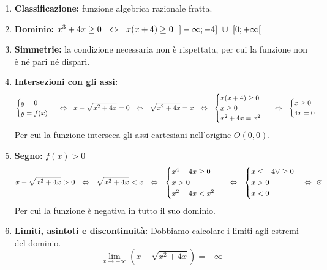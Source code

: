     \begin{ex}
        [Studiare la funzione $y=x-\sqrt{x^2+4x}$, tralasciando la derivata seconda.]
        \begin{enumerate}
            \item \textbf{Classificazione:} funzione algebrica razionale fratta.
            \item \textbf{Dominio:} $x^3+4x\geq 0\ \ \Harr \ \ x(x+4)\geq 0\ \ ]-\infty;-4]\ \cup \ [0;+\infty[$
            \item \textbf{Simmetrie:} la condizione necessaria non è rispettata, per cui la funzione non è né pari né dispari.
            \item \textbf{Intersezioni con gli assi:} 
            \[\begin{cases}
                y=0\\
                y=f(x)
            \end{cases}\ \Harr \ \ x-\sqrt{x^2+4x}=0\ \ \Harr \ \ \sqrt{x^2+4x}=x\ \ \Harr\ \ \begin{cases}
                x(x+4)\geq 0\\
                x\geq 0\\
                x^2+4x=x^2
            \end{cases}\ \ \Harr\ \ \begin{cases}
                x\geq 0\\
                4x=0
            \end{cases}\]
            Per cui la funzione interseca gli assi cartesiani nell'origine $O(0,0)$.
            \item \textbf{Segno: }$f(x)>0$
            \[x-\sqrt{x^2+4x}>0\ \ \Harr\ \  \sqrt{x^2+4x}<x \ \ \Harr \ \ \begin{cases}
                x^4+4x\geq 0\\
                x>0\\
                x^2+4x<x^2
            \end{cases}\ \ \Harr \ \ \begin{cases}
                x\leq -4 \lor \geq 0\\
                x>0\\
                x<0
            \end{cases}\Harr\ \varnothing\]
            Per cui la funzione è negativa in tutto il suo dominio.
            \item \textbf{Limiti, asintoti e discontinuità:} Dobbiamo calcolare i limiti agli estremi del dominio.
            \[\lim_{x\to-\infty}\left( x-\sqrt{x^2+4x} \right)=-\infty\]

\end{enumerate}
\end{ex}
